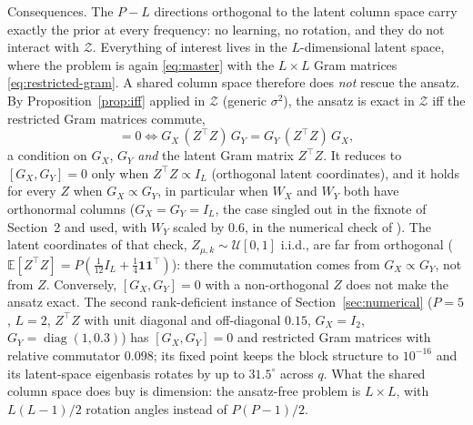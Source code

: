 \documentclass[11pt,a4paper]{article}
\newcommand{\diag}{\operatorname{diag}}
\newcommand{\Z}{\mathcal Z}
\begin{document}
Consequences. The $P - L$ directions orthogonal to the latent column space carry exactly the prior at every frequency: no learning, no rotation, and they do not interact with $\Z$. Everything of interest lives in the $L$-dimensional latent space, where the problem is again \eqref{eq:master} with the $L\times L$ Gram matrices \eqref{eq:restricted-gram}. A shared column space therefore does \emph{not} rescue the ansatz. By Proposition~\ref{prop:iff} applied in $\Z$ (generic $\sigma^2$), the ansatz is exact in $\Z$ iff the restricted Gram matrices commute,
\begin{equation}
  [W G_X W^\top, W G_Y W^\top] = 0 \iff G_X\,(Z^\top Z)\,G_Y = G_Y\,(Z^\top Z)\,G_X,
  \label{eq:restricted-commute}
\end{equation}
a condition on $G_X$, $G_Y$ \emph{and} the latent Gram matrix $Z^\top Z$. It reduces to $[G_X, G_Y] = 0$ only when $Z^\top Z \propto I_L$ (orthogonal latent coordinates), and it holds for every $Z$ when $G_X \propto G_Y$, in particular when $W_X$ and $W_Y$ both have orthonormal columns ($G_X = G_Y = I_L$, the case singled out in the fixnote of Section~2 and used, with $W_Y$ scaled by $0.6$, in the numerical check of ). The latent coordinates of that check, $Z_{\mu,k} \sim \mathcal U[0,1]$ i.i.d., are far from orthogonal ($\mathbb E[Z^\top Z] = P(\tfrac1{12} I_L + \tfrac14 \mathbf 1\mathbf 1^\top)$): there the commutation comes from $G_X \propto G_Y$, not from $Z$. Conversely, $[G_X, G_Y] = 0$ with a non-orthogonal $Z$ does not make the ansatz exact. The second rank-deficient instance of Section~\ref{sec:numerical} ($P = 5$, $L = 2$, $Z^\top Z$ with unit diagonal and off-diagonal $0.15$, $G_X = I_2$, $G_Y = \diag(1, 0.3)$) has $[G_X, G_Y] = 0$ and restricted Gram matrices with relative commutator $0.098$; its fixed point keeps the block structure to $10^{-16}$ and its latent-space eigenbasis rotates by up to $31.5^\circ$ across $q$. What the shared column space does buy is dimension: the ansatz-free problem is $L\times L$, with $L(L-1)/2$ rotation angles instead of $P(P-1)/2$.
\end{document}
